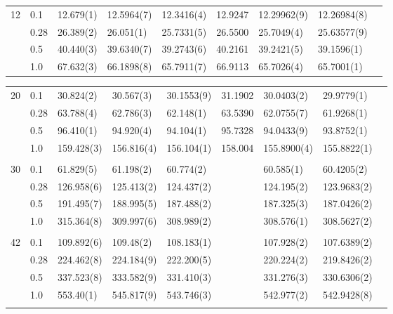{\begin{landscape}
\begin{table}
\begin{tabularx}{\hsize}{llR{2.65cm}R{2.65cm}R{2.65cm}R{2.65cm}R{2.65cm}R{2.65cm}R{2.65cm}}
				12 & 0.1 & 12.679(1) & 12.5964(7) & 12.3416(4) & 12.9247\phantom{$^*$} & 12.29962(9) & 12.26984(8) \\ 
				& 0.28 & 26.389(2) & 26.051(1) & 25.7331(5) & 26.5500\phantom{$^*$} & 25.7049(4) & 25.63577(9) \\
				& 0.5 & 40.440(3) & 39.6340(7) & 39.2743(6) & 40.2161\phantom{$^*$} & 39.2421(5) & 39.1596(1) \\
				& 1.0 & 67.632(3) & 66.1898(8) & 65.7911(7) & 66.9113\phantom{$^*$} & 65.7026(4) & 65.7001(1) \\ \hline
			\end{tabularx}
		\end{table}
		
		\begin{table}
			\label{tab:quantumdotswinteraction2D2}
			\begin{tabularx}{\hsize}{llR{2.65cm}R{2.65cm}R{2.65cm}R{2.65cm}R{2.65cm}R{2.65cm}R{2.65cm}} \\
				20 & 0.1 & 30.824(2) & 30.567(3) & 30.1553(9) & 31.1902\phantom{$^*$} & 30.0403(2) & 29.9779(1) \\ 
				& 0.28 & 63.788(4) & 62.786(3) & 62.148(1) & 63.5390\phantom{$^*$} & 62.0755(7) & 61.9268(1) \\
				& 0.5 & 96.410(1) & 94.920(4) & 94.104(1) & 95.7328\phantom{$^*$} & 94.0433(9) & 93.8752(1) \\
				& 1.0 & 159.428(3) & 156.816(4) & 156.104(1) & 158.004\phantom{$^*$} & 155.8900(4) & 155.8822(1) & \phantom{=} \\ 
				\hline \\
				
				30 & 0.1 & 61.829(5) & 61.198(2) & 60.774(2) & & 60.585(1) & 60.4205(2) \\ 
				& 0.28 & 126.958(6) & 125.413(2) & 124.437(2) & & 124.195(2) & 123.9683(2) \\
				& 0.5 & 191.495(7) & 188.995(5) & 187.488(2) & & 187.325(3) & 187.0426(2) \\
				& 1.0 & 315.364(8) & 309.997(6) & 308.989(2) & & 308.576(1) & 308.5627(2) \\ \hline \\
				
				42 & 0.1 & 109.892(6) & 109.48(2) & 108.183(1) & &  107.928(2) & 107.6389(2) \\ 
				& 0.28 & 224.462(8) & 224.184(9) & 222.200(5) & & 220.224(2) & 219.8426(2) \\
				& 0.5 & 337.523(8) & 333.582(9) & 331.410(3) & & 331.276(3) & 330.6306(2) \\
				& 1.0 & 553.40(1) & 545.817(9) & 543.746(3) & & 542.977(2) & 542.9428(8) \\ \hline \\
				

\end{tabularx}
\end{table}
\end{landscape}}
